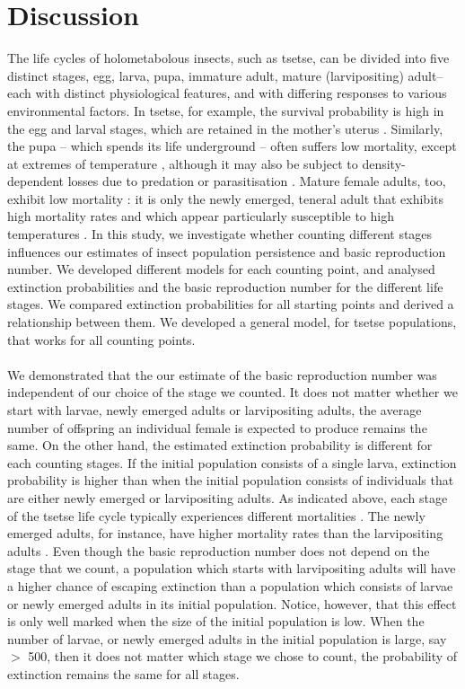 \documentclass[smallextended]{svjour3}
\begin{document}
\section{Discussion}

The life cycles of holometabolous insects, such as tsetse, can be divided into five distinct stages, egg, larva, pupa, immature adult, mature (larvipositing) adult– each with distinct physiological features, and with differing responses to various environmental factors. In tsetse, for example,  the survival probability is high in the egg and larval stages, which are retained in the mother’s uterus \cite{Hargrove1999a}. Similarly, the pupa – which spends its life underground – often suffers low mortality, except at extremes of temperature \cite{PhelpsR.J.&Burrows}, although it may also be subject to density-dependent losses due to predation or parasitisation \cite{Rogers1984,RogersD.J.Randolph1984}. Mature female adults, too, exhibit low mortality \cite{Hargrove2011}: it is only the newly emerged, teneral adult that exhibits high mortality rates and which appear particularly susceptible to high temperatures \cite{Ackley2017a}. In this study, we investigate whether counting different stages influences our estimates of insect population persistence and basic reproduction number. We developed different models for each counting point, and analysed extinction probabilities and the basic reproduction number for the different life stages. We compared extinction probabilities for all starting points and derived a relationship between them. We developed a general model, for tsetse populations, that works for all counting points. 
\paragraph{}
We demonstrated that the our estimate of the basic reproduction number was independent of our choice of the stage we counted. It does not matter whether we start with larvae, newly emerged adults or larvipositing adults, the average number of offspring an individual female is expected to produce remains the same. On the other hand, the estimated extinction probability is different for each counting stages. If the initial population consists of a single larva, extinction probability is higher than when the initial population consists of individuals that are either newly emerged or larvipositing adults. As indicated above, each stage of the tsetse life cycle typically experiences different mortalities \cite{Hargrove2005a}. The newly emerged adults, for instance, have higher mortality rates than the larvipositing adults  \cite{Hargrove2019a}. Even though the basic reproduction number does not depend on the stage that we count, a population which starts with larvipositing adults will have a higher chance of escaping extinction than a population which consists of larvae or newly emerged adults in its initial population. Notice, however, that this effect is only well marked when the size of the initial population is low. When the number of larvae, or newly emerged adults in the initial population is large, say $>$ 500, then it does not matter which stage we chose to count, the probability of extinction remains the same for all stages.
\end{document}
